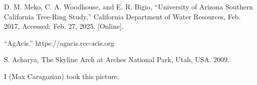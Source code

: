 \documentclass[]{article}
\begin{document}
\begin{thebibliography}{9}
	D. M. Meko, C. A. Woodhouse, and E. R. Bigio, “University of Arizona
	Southern California Tree-Ring Study,” California Department of Water Resources, Feb. 2017, Accessed: Feb. 27, 2025. [Online].
	
	“AgAcis.” https://agacis.rcc-acis.org
	
	S. Acharya, The Skyline Arch at Arches National Park, Utah, USA. 2009.
	
	I (Max Caragozian) took this picture.
\end{thebibliography}
\end{document}
